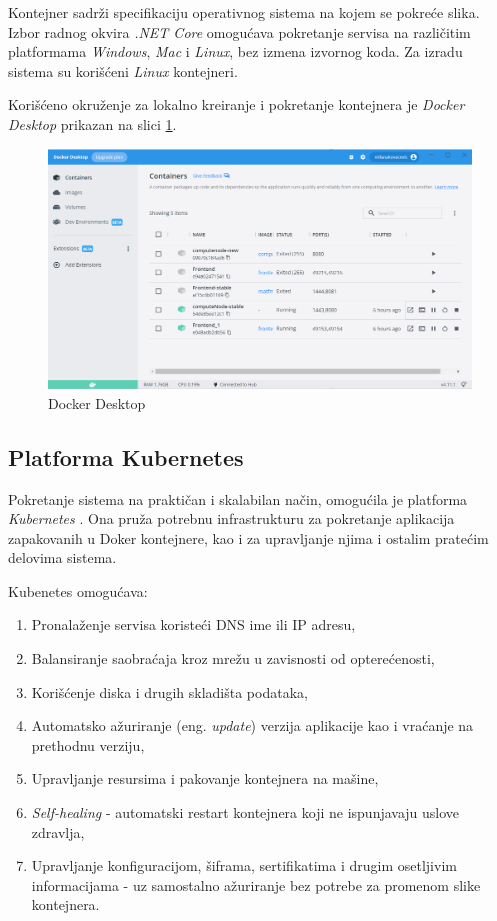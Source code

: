 \documentclass[12pt,oneside]{memoir}
\begin{document}
Kontejner sadrži specifikaciju operativnog sistema na kojem se pokreće slika. Izbor radnog okvira \emph{.NET Core} omogućava pokretanje servisa na različitim platformama \emph{Windows}, \emph{Mac} i \emph{Linux}, bez izmena izvornog koda. Za izradu sistema su korišćeni \emph{Linux} kontejneri.

Korišćeno okruženje za lokalno kreiranje i pokretanje kontejnera je \emph{Docker Desktop} prikazan na slici \ref{fig:dockerdesktop}.

\begin{figure}[!ht]
  \centering
  \includegraphics[width=1.0\textwidth]{./images/docker_desktop.png}
  \caption{Docker Desktop}
  \label{fig:dockerdesktop}
\end{figure}

\subsection{Platforma Kubernetes}

Pokretanje sistema na praktičan i skalabilan način, omogućila je platforma \emph{Kubernetes} \cite{Kubernetes}. Ona pruža potrebnu infrastrukturu za pokretanje aplikacija zapakovanih u Doker kontejnere, kao i za upravljanje njima i ostalim pratećim delovima sistema.

Kubenetes omogućava:
\begin{enumerate}
\item Pronalaženje servisa koristeći DNS ime ili IP adresu,
\item Balansiranje saobraćaja kroz mrežu u zavisnosti od opterećenosti,
\item Korišćenje diska i drugih skladišta podataka,
\item Automatsko ažuriranje (eng. \emph{update}) verzija aplikacije kao i vraćanje na prethodnu verziju,
\item Upravljanje resursima i pakovanje kontejnera na mašine,
\item \emph{Self-healing} - automatski restart kontejnera koji ne ispunjavaju uslove zdravlja,
\item Upravljanje konfiguracijom, šiframa, sertifikatima i drugim osetljivim informacijama - uz samostalno ažuriranje bez potrebe za promenom slike kontejnera.
\end{enumerate}
\end{document}
